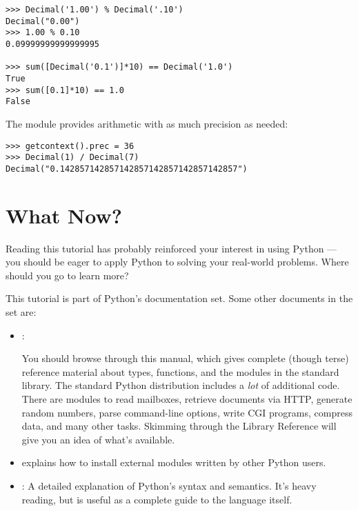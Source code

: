 \documentclass{manual}
\begin{document}
\begin{verbatim}
>>> Decimal('1.00') % Decimal('.10')
Decimal("0.00")
>>> 1.00 % 0.10
0.09999999999999995
       
>>> sum([Decimal('0.1')]*10) == Decimal('1.0')
True
>>> sum([0.1]*10) == 1.0
False      
\end{verbatim}

The  module provides arithmetic with as much precision as
needed:

\begin{verbatim}
>>> getcontext().prec = 36
>>> Decimal(1) / Decimal(7)
Decimal("0.142857142857142857142857142857142857")
\end{verbatim}



\chapter{What Now? \label{whatNow}}

Reading this tutorial has probably reinforced your interest in using
Python --- you should be eager to apply Python to solving your
real-world problems. Where should you go to learn more?

This tutorial is part of Python's documentation set.  
Some other documents in the set are:

\begin{itemize}

\item {}:

You should browse through this manual, which gives complete (though
terse) reference material about types, functions, and the modules in
the standard library.  The standard Python distribution includes a
\emph{lot} of additional code.  There are modules to read \UNIX{}
mailboxes, retrieve documents via HTTP, generate random numbers, parse
command-line options, write CGI programs, compress data, and many other tasks.
Skimming through the Library Reference will give you an idea of
what's available.

\item {}
explains how to install external modules written by other Python
users.

\item {}: A detailed 
explanation of Python's syntax and semantics.  It's heavy reading, 
but is useful as a complete guide to the language itself.

\end{itemize}
\end{document}

